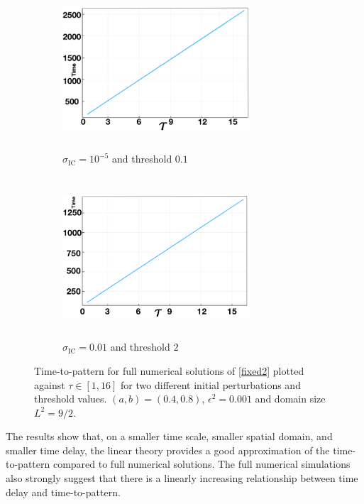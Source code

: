 \begin{figure}[H]
    \centering
    \begin{subfigure}[t]{0.45\textwidth}
        \centering
        \includegraphics[width=7cm,height=6cm]{longlin3.png}
        \caption{$\sigma_{\text{IC}}=10^{-5}$ and threshold $0.1$}
        \label{fig:linperturb2a}
    \end{subfigure}
    \hfill
    \begin{subfigure}[t]{0.45\textwidth}
        \centering
        \includegraphics[width=7cm,height=6cm]{longlin4.png}
        \caption{$\sigma_{\text{IC}}=0.01$ and threshold $2$}
        \label{fig:linperturb2b}
    \end{subfigure}
    \caption{Time-to-pattern for full numerical solutions of \eqref{fixed2} plotted against $\tau\in[1,16]$ for two different initial perturbations and threshold values. $(a,b)=(0.4,0.8)$, $\epsilon^2=0.001$ and domain size $L^2=9/2$.}
    \label{fig:linperturb2}
\end{figure}

The results show that, on a smaller time scale, smaller spatial domain, and smaller time delay, the linear theory provides a good approximation of the time-to-pattern compared to full numerical solutions. The full numerical simulations also strongly suggest that there is a linearly increasing relationship between time delay and time-to-pattern.
